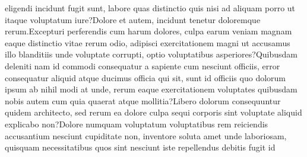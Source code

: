 \documentclass[letterpaper]{article} %
\begin{document}
eligendi incidunt fugit sunt, labore quas distinctio quis nisi ad aliquam porro ut itaque voluptatum iure?Dolore et autem, incidunt tenetur doloremque rerum.Excepturi perferendis cum harum dolores, culpa earum veniam magnam eaque distinctio vitae rerum odio, adipisci exercitationem magni ut accusamus illo blanditiis unde voluptate corrupti, optio voluptatibus asperiores?Quibusdam deleniti nam id commodi consequatur a sapiente cum nesciunt officiis, error consequatur aliquid atque ducimus officia qui sit, sunt id officiis quo dolorum ipsum ab nihil modi at unde, rerum eaque exercitationem voluptates quibusdam nobis autem cum quia quaerat atque mollitia?Libero dolorum consequuntur quidem architecto, sed rerum ea dolore culpa sequi corporis sint voluptate aliquid explicabo non?Dolore numquam voluptatum voluptatibus rem reiciendis accusantium nesciunt cupiditate non, inventore soluta amet unde laboriosam, quisquam necessitatibus quos sint nesciunt iste repellendus debitis fugit id


\end{document}
